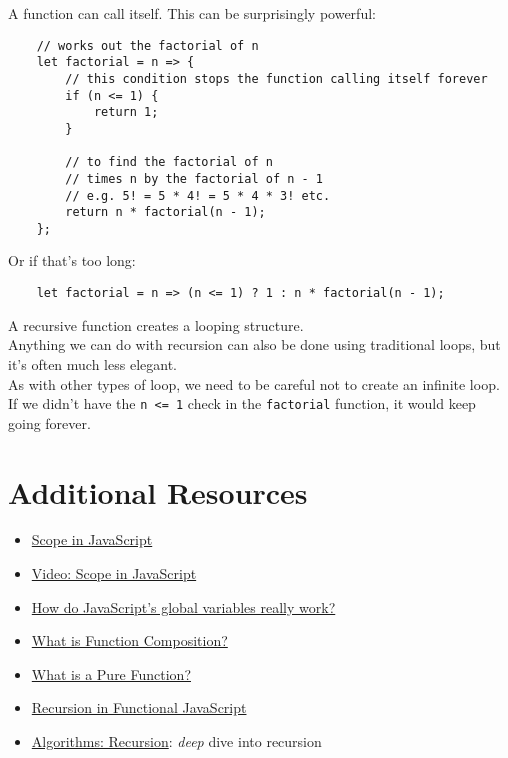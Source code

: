 
A function can call itself. This can be surprisingly powerful:

\begin{verbatim}
    // works out the factorial of n
    let factorial = n => {
        // this condition stops the function calling itself forever
        if (n <= 1) {
            return 1;
        }

        // to find the factorial of n
        // times n by the factorial of n - 1
        // e.g. 5! = 5 * 4! = 5 * 4 * 3! etc.
        return n * factorial(n - 1);
    };
\end{verbatim}

Or if that's too long:

\begin{verbatim}
    let factorial = n => (n <= 1) ? 1 : n * factorial(n - 1);
\end{verbatim}

A recursive function creates a looping structure.
\\

Anything we can do with recursion can also be done using traditional loops, but it's often much less elegant.
\\

As with other types of loop, we need to be careful not to create an infinite loop. If we didn't have the \texttt{n <= 1} check in the \texttt{factorial} function, it would keep going forever.

\pagebreak

\section{Additional Resources}

\begin{itemize}[leftmargin=*]
    \item \href{https://scotch.io/tutorials/understanding-scope-in-javascript}{Scope in JavaScript}
    \item \href{https://www.youtube.com/watch?v=5LEuJNLfLN0}{Video: Scope in JavaScript}
    \item \href{https://2ality.com/2019/07/global-scope.html}{How do JavaScript’s global variables really work?}
    \item \href{https://medium.com/javascript-scene/master-the-javascript-interview-what-is-function-composition-20dfb109a1a0}{What is Function Composition?}
    \item \href{https://medium.com/javascript-scene/master-the-javascript-interview-what-is-a-pure-function-d1c076bec976}{What is a Pure Function?}
    \item \href{https://www.sitepoint.com/recursion-functional-javascript/}{Recursion in Functional JavaScript}
    \item \href{http://jeffe.cs.illinois.edu/teaching/algorithms/book/01-recursion.pdf}{Algorithms: Recursion}: \textit{deep} dive into recursion
\end{itemize}
